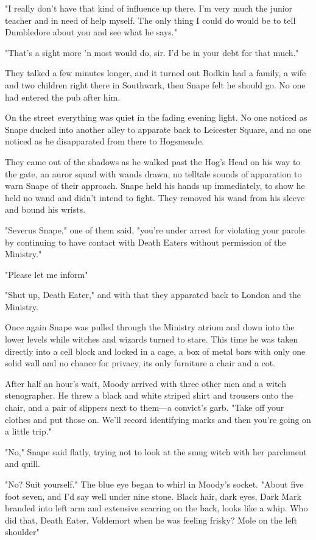 "I really don't have that kind of influence up there. I'm very much the junior teacher and in need of help myself. The only thing I could do would be to tell Dumbledore about you and see what he says."

"That's a sight more 'n most would do, sir. I'd be in your debt for that much."

They talked a few minutes longer, and it turned out Bodkin had a family, a wife and two children right there in Southwark, then Snape felt he should go. No one had entered the pub after him.

On the street everything was quiet in the fading evening light. No one noticed as Snape ducked into another alley to apparate back to Leicester Square, and no one noticed as he disapparated from there to Hogsmeade.

They came out of the shadows as he walked past the Hog's Head on his way to the gate, an auror squad with wands drawn, no telltale sounds of apparation to warn Snape of their approach. Snape held his hands up immediately, to show he held no wand and didn't intend to fight. They removed his wand from his sleeve and bound his wrists.

"Severus Snape," one of them said, "you're under arrest for violating your parole by continuing to have contact with Death Eaters without permission of the Ministry."

"Please let me inform{\el}"

"Shut up, Death Eater," and with that they apparated back to London and the Ministry.

Once again Snape was pulled through the Ministry atrium and down into the lower levels while witches and wizards turned to stare. This time he was taken directly into a cell block and locked in a cage, a box of metal bars with only one solid wall and no chance for privacy, its only furniture a chair and a cot.

After half an hour's wait, Moody arrived with three other men and a witch stenographer. He threw a black and white striped shirt and trousers onto the chair, and a pair of slippers next to them—a convict's garb. "Take off your clothes and put those on. We'll record identifying marks and then you're going on a little trip."

"No," Snape said flatly, trying not to look at the smug witch with her parchment and quill.

"No? Suit yourself." The blue eye began to whirl in Moody's socket. "About five foot seven, and I'd say well under nine stone. Black hair, dark eyes, Dark Mark branded into left arm and extensive scarring on the back, looks like a whip. Who did that, Death Eater, Voldemort when he was feeling frisky? Mole on the left shoulder{\el}"

